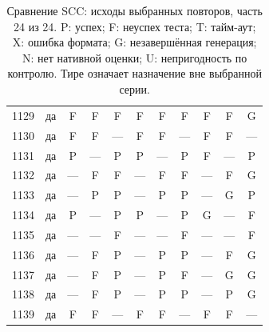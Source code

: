 \begin{table}[p]
\begin{tabular*}{\textwidth}{@{\extracolsep{\fill}}rc*{9}{c}@{}}
1129 & да & F & F & F & F & F & F & F & F & G\\
1130 & да & F & F & — & F & F & — & F & F & —\\
1131 & да & P & — & P & P & — & P & F & — & P\\
1132 & да & — & F & F & — & F & F & — & F & G\\
1133 & да & — & P & P & — & P & P & — & G & P\\
1134 & да & P & — & P & P & — & P & G & — & F\\
1135 & да & — & — & F & — & — & F & — & — & F\\
1136 & да & — & F & P & — & P & P & — & F & G\\
1137 & да & — & F & P & — & P & F & — & G & G\\
1138 & да & — & F & P & — & P & P & — & P & G\\
1139 & да & F & F & — & F & F & — & F & F & —\\
\bottomrule\end{tabular*}
\caption{Сравнение SCC: исходы выбранных повторов, часть 24 из 24. P: успех; F: неуспех теста; T: тайм-аут; X: ошибка формата; G: незавершённая генерация; N: нет нативной оценки; U: непригодность по контролю. Тире означает назначение вне выбранной серии.}
\end{table}
\clearpage
